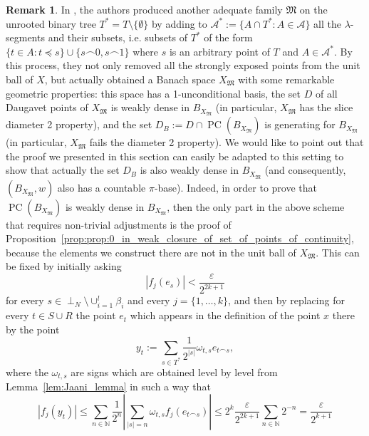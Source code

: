 \documentclass[11pt,a4paper,reqno]{amsart}
\numberwithin{equation}{section}
\newcommand{\abs}[1]{\left\lvert#1\right\rvert}
\newcommand{\N}{\mathbb{N}}
\newcommand{\A}{\mathcal{A}}
\newcommand{\eps}{\varepsilon}
\DeclareMathOperator{\PC}{PC}
\newcommand{\1}{\mathbbm{1}}
\renewcommand{\leq}{\leqslant}
\theoremstyle{plain}
\theoremstyle{definition}
\newtheorem{remark}[theorem]{Remark}
\begin{document}
\begin{remark}
    In \cite[Section~4]{ALMT}, the authors produced another adequate family $\mathfrak{M}$ on the unrooted binary tree $T^*=T\setminus\{\emptyset\}$ by adding to $\A^*:=\{A\cap T^*\colon A\in\A\}$ all the $\lambda$-segments and their subsets, i.e. subsets of $T^*$ of the form $\{t\in A\colon t\preceq s\}\cup\{s\smallfrown 0,s\smallfrown 1\}$ where $s$ is an arbitrary point of $T$ and $A\in\A^*$. By this process, they not only removed all the strongly exposed points from the unit ball of $X$, but actually obtained a Banach space $X_\mathfrak{M}$ with some remarkable geometric properties: this space has a 1-unconditional basis, the set $D$ of all Daugavet points of $X_\mathfrak{M}$ is weakly dense in $B_{X_\mathfrak{M}}$ (in particular, $X_\mathfrak{M}$ has the slice diameter 2 property), and the set $D_B:=D\cap \PC(B_{X_\mathfrak{M}})$ is generating for $B_{X_\mathfrak{M}}$ (in particular, $X_\mathfrak{M}$ fails the diameter 2 property). We would like to point out that the proof we presented in this section can easily be adapted to this setting to show that actually the set $D_B$ is also weakly dense in $B_{X_\mathfrak{M}}$ (and consequently, $(B_{X_\mathfrak{M}},w)$ also has a countable $\pi$-base). Indeed, in order to prove that $\PC(B_{X_\mathfrak{M}})$ is weakly dense in $B_{X_\mathfrak{M}}$, then the only part in the above scheme that requires non-trivial adjustments is the proof of Proposition~\ref{prop:prop:0_in_weak_closure_of_set_of_points_of_continuity}, because the elements we construct there are not in the unit ball of $X_\mathfrak{M}$. This can be fixed by initially asking \begin{equation*}
        \abs{f_j(e_s)}<\frac{\eps}{2^{2k+1}}
    \end{equation*} for every $s\in\perp_{N}\setminus\cup_{i=1}^l\beta_i$ and every $j=\{1,\dots,k\}$, and then by replacing for every $t\in S\cup R$ the point $e_t$ which appears in the definition of the point $x$ there by the point  \begin{equation*}
        y_t:=\sum_{s\in T^*}\frac{1}{2^{\abs{s}}}\omega_{t,s}e_{t\smallfrown s}, 
    \end{equation*} where the $\omega_{t,s}$ are signs which are obtained level by level from Lemma~\ref{lem:Jaani_lemma} in such a way that \begin{equation*}
        \abs{f_j(y_t)}\leq \sum_{n\in\N}\frac{1}{2^n}\abs{\sum_{\abs{s}=n}\omega_{t,s}f_j(e_{t\smallfrown s})}\leq 2^k\frac{\eps}{2^{2k+1}}\sum_{n\in\N}2^{-n}=\frac{\eps}{2^{k+1}}

\end{equation*}
\end{remark}
\end{document}
